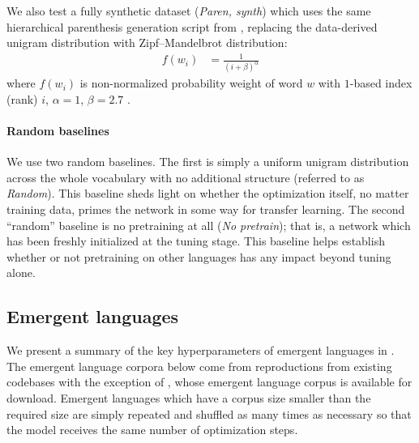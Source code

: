 We also test a fully synthetic dataset (\emph{Paren, synth}) which uses the same hierarchical parenthesis generation script from \citet{Papadimitriou2020LearningMH}, replacing the data-derived unigram distribution with Zipf--Mandelbrot distribution:
\begin{align}
  f(w_i) &= \frac{1}{{(i+\beta)}^\alpha}
\end{align}
where $f(w_i)$ is non-normalized probability weight of word $w$ with $1$-based index (rank) $i$, $\alpha=1$, $\beta=2.7$ \citep{mandelbrot1953informational,Piantadosi2014-ru}.


\paragraph{Random baselines}

We use two random baselines.
The first is simply a uniform unigram distribution across the whole vocabulary with no additional structure (referred to as \emph{Random}).
This baseline sheds light on whether the optimization itself, no matter training data, primes the network in some way for transfer learning.
The second ``random'' baseline is no pretraining at all (\emph{No pretrain}); that is, a network which has been freshly initialized at the tuning stage.
This baseline helps establish whether or not pretraining on other languages has any impact beyond tuning alone.


\subsection{Emergent languages}
\unskip\label{sec:em-langs}

We present a summary of the key hyperparameters of emergent languages in .
The emergent language corpora below come from reproductions from existing codebases with the exception of \citet{yao2022linking}, whose emergent language corpus is available for download.
Emergent languages which have a corpus size smaller than the required size are simply repeated and shuffled as many times as necessary so that the model receives the same number of optimization steps.

